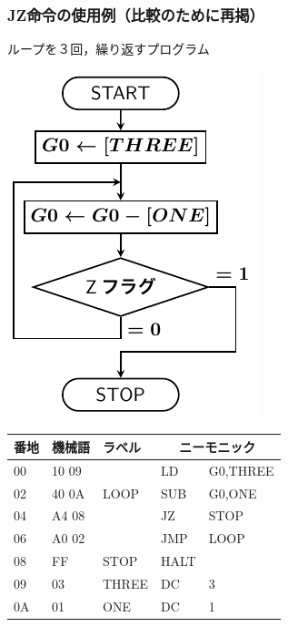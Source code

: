 \documentclass{beamer}                 %
\begin{document}
\begin{frame}
  \frametitle{JZ命令の使用例（比較のために再掲）}
  ループを３回，繰り返すプログラム\\
  \vfill
  \begin{minipage}{0.4\columnwidth}
    \centerline{\includegraphics[scale=0.7]{../Tikz/flow0B.pdf}}
  \end{minipage}
  \begin{minipage}{0.59\columnwidth}
    {\ttfamily\small\begin{center}
      \begin{tabular}{|l|l|l|l l|} \hline
        番地 & 機械語 & ラベル & \multicolumn{2}{|c|}{ニーモニック} \\
        \hline
        00 & 10 09 &           & LD   & G0,THREE              \\
        02 & 40 0A &  LOOP     & SUB  & G0,ONE                \\
        04 & A4 08 &           & JZ   & STOP                  \\
        06 & A0 02 &           & JMP  & LOOP                  \\
        08 & FF    &  STOP     & HALT &                       \\
        09 & 03    &  THREE    & DC   & 3                     \\
        0A & 01    &  ONE      & DC   & 1                     \\
        \hline
      \end{tabular}
    \end{center}}
  \end{minipage}
  \vfill
\end{frame}
\end{document}
